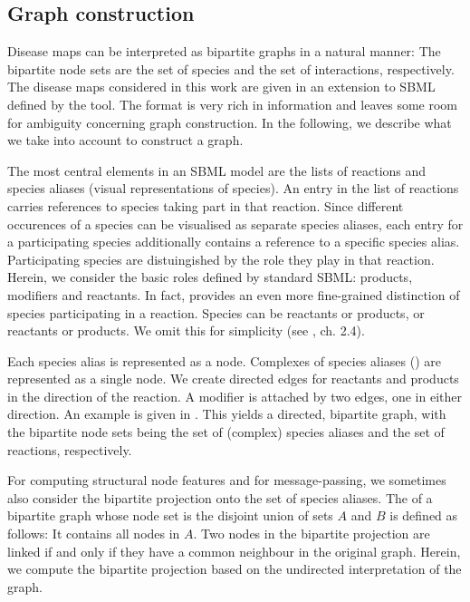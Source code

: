 \documentclass[
	fontsize=10pt, %
	twoside=true, %
	secnumdepth=1, %
  toc=indentunnumbered %
]{kaobook}
\begin{document}
\subsection{Graph construction}
\label{sec:graph-interpretation}
Disease maps can be interpreted as bipartite graphs in a natural manner: The
bipartite node sets are the set of species and the set of interactions, respectively.
The disease maps considered in this work are given in an extension
to SBML defined by the  tool. The format is very rich in
information and leaves some room for ambiguity concerning graph construction. In
the following, we describe what we take into account to construct a graph.

The most central elements in an SBML model are the lists of reactions and
species aliases (visual representations of species). 
%
An entry in the list of reactions carries references to species taking part in
that reaction. Since different occurences of a species can be visualised as
separate species aliases, each entry for a participating species additionally
contains a reference to a specific species alias. Participating species are
distuingished by the role they play in that reaction. Herein, we consider the
basic roles defined by standard SBML: products, modifiers and reactants. In
fact,  provides an even more fine-grained distinction of
species participating in a reaction. Species can be  reactants or
products,  or  reactants or products. We omit
this for simplicity (see \cite{_CellDesignerExtensionTag_2010}, ch. 2.4).

Each species alias is represented as a node. Complexes of species aliases
() are represented as a single node. We create
directed edges for reactants and products in the direction of the reaction. A
modifier is attached by two edges, one in either direction. An example is given
in . This yields a directed, bipartite graph, with
the bipartite node sets being the set of (complex) species aliases and the set
of reactions, respectively.

For computing structural node features and for message-passing, we sometimes
also consider the bipartite projection onto the set of species aliases. The
 of a bipartite graph whose node set is the
disjoint union of sets $A$ and $B$ is defined as follows: It contains all nodes
in $A$. Two nodes in the bipartite projection are linked if and only if they
have a common neighbour in the original graph. Herein, we compute the bipartite
projection based on the undirected interpretation of the graph.
\end{document}
